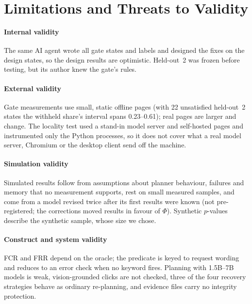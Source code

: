 \section{Limitations and Threats to Validity}
\label{sec:limits}

\paragraph{Internal validity} The same AI agent wrote all gate states and labels and designed the fixes on the design states, so the design results are optimistic. Held-out~2 was frozen before testing, but its author knew the gate's rules. 

\paragraph{External validity} Gate measurements use small, static offline pages (with 22 unsatisfied held-out~2 states the withheld share's interval spans 0.23--0.61); real pages are larger and change. The locality test used a stand-in model server and self-hosted pages and instrumented only the Python processes, so it does not cover what a real model server, Chromium or the desktop client send off the machine. 


\paragraph{Simulation validity} Simulated results follow from assumptions about planner behaviour, failures and memory that no measurement supports, rest on small measured samples, and come from a model revised twice after its first results were known (not pre-registered; the corrections moved results in favour of $\Phi$). Synthetic $p$-values describe the synthetic sample, whose size we chose.

\paragraph{Construct and system validity} FCR and FRR depend on the oracle; the predicate is keyed to request wording and reduces to an error check when no keyword fires. Planning with 1.5B--7B models is weak, vision-grounded clicks are not checked, three of the four recovery strategies behave as ordinary re-planning, and evidence files carry no integrity protection.
